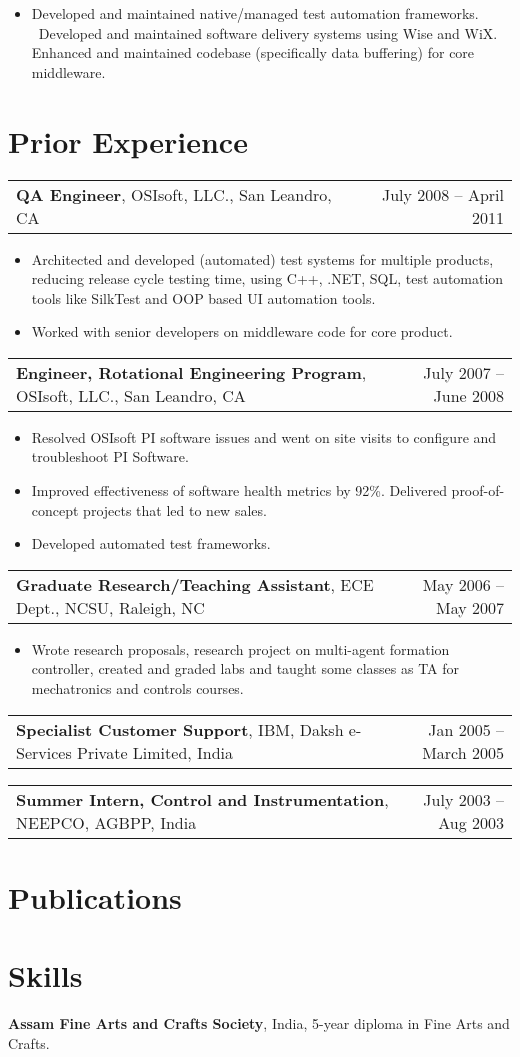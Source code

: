 \documentclass[letterpaper,10pt]{article}
\makeatletter
\newcommand{\experienceItem}[3]{
	\begin{tabular*}{\textwidth}{c@{\extracolsep{\fill}}c}
		\multicolumn{1}{l}{\textbf{#1}, #2} & \multicolumn{1}{r}{#3}\\
	\end{tabular*}\vspace{-10pt}
}
\newcommand{\resumeItemListStart}{\begin{itemize}}
\newcommand{\resumeItemListEnd}{\end{itemize}}
\newcommand{\resumeListItem}[1]{
	\item{#1 \vspace{-6pt}}
}
\makeatother
\begin{document}
	
	\resumeItemListStart
	\resumeListItem {Developed and maintained native/managed test automation frameworks. \ Developed and maintained software delivery systems using Wise and WiX. Enhanced and maintained codebase (specifically data buffering) for core middleware.}
	\resumeItemListEnd

	\section{Prior Experience}
	
	\experienceItem{QA Engineer}{OSIsoft, LLC., San Leandro, CA}{July 2008 -- April 2011}	
	\vspace{-8pt}
	\resumeItemListStart
	\resumeListItem {Architected and developed (automated) test systems for multiple products, reducing release cycle testing time, using C++, .NET, SQL, test automation tools like SilkTest and OOP based UI automation tools.}
	\resumeListItem {Worked with senior developers on middleware code for core product.}
	\resumeItemListEnd
	
	\experienceItem{Engineer, Rotational Engineering Program}{OSIsoft, LLC., San Leandro, CA}{July 2007 -- June 2008}
	\vspace{-8pt}	
	\resumeItemListStart
	\resumeListItem {Resolved OSIsoft PI software issues and went on site visits to configure and troubleshoot PI Software.}
	\resumeListItem {Improved effectiveness of software health metrics by 92\%. Delivered proof-of-concept projects that led to new sales.}
	\resumeListItem {Developed automated test frameworks.}
	\resumeItemListEnd
	
	\experienceItem{Graduate Research/Teaching Assistant}{ECE Dept., NCSU, Raleigh, NC}{May 2006 -- May 2007}
	\vspace{-8pt}
	\resumeItemListStart
	\resumeListItem {Wrote research proposals, research project on multi-agent formation controller, created and graded labs and taught some classes as TA for mechatronics and controls courses.}
	\resumeItemListEnd
	
	\experienceItem{Specialist Customer Support}{IBM, Daksh e-Services Private Limited, India}{Jan 2005 -- March 2005}
	
	\experienceItem{Summer Intern, Control and Instrumentation}{NEEPCO, AGBPP, India}{July 2003 -- Aug 2003}

	\section{Publications}
	
	

	\section{Skills}

	

	\textbf{Assam Fine Arts and Crafts Society}, India, 5-year diploma in Fine Arts and Crafts.

\end{document}
